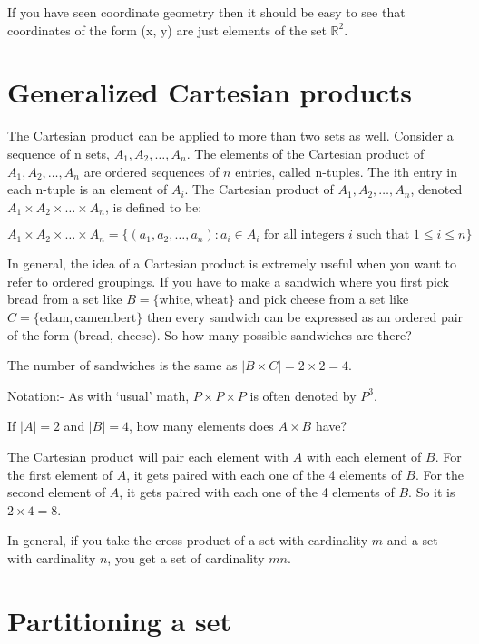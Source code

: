 \documentclass[12pt]{article}
\begin{document}
If you have seen coordinate geometry then it should be easy to see that coordinates of the form (x, y) are just elements of the set $\mathbb{R}^2$. 

\section*{Generalized Cartesian products}

The Cartesian product can be applied to more than two sets as well. Consider a sequence of n sets, $A_1, A_2, \ldots, A_n$. The elements of the Cartesian product of $A_1, A_2, \ldots, A_n$ are ordered sequences of $n$ entries, called n-tuples. The ith entry in each n-tuple is an element of $A_i$. The Cartesian product of $A_1, A_2, \ldots, A_n$, denoted $A_1 \times A_2 \times \ldots \times A_n$, is defined to be:

$A_1 \times A_2 \times \ldots \times A_n = \{ (a_1, a_2, \ldots , a_n) : a_i \in A_i \text{ for all integers } i \text{ such that } 1 \le i \le n\}$

In general, the idea of a Cartesian product is extremely useful when you want to refer to ordered groupings. If you have to make a sandwich where you first pick bread from a set like $B = \{\text{white},\text{wheat}\}$ and pick cheese from a set like 
$C = \{\text{edam}, \text{camembert}\}$ then every sandwich can be expressed as an ordered pair of the form (bread, cheese). So how many possible sandwiches are there? 

The number of sandwiches is the same as $|B \times C| = 2 \times 2 = 4$.

\vspace{1cm}

Notation:- As with `usual' math, $P \times P \times P$ is often denoted by $P^3$.
\vspace{1cm}

If $|A| = 2$ and $|B| = 4$, how many elements does $A \times B$ have?

The Cartesian product will pair each element with $A$ with each element of $B$. For the first element of $A$, it gets paired with each one of the 4 elements of $B$. For the second element of $A$, it gets paired with each one of the 4 elements of $B$. So it is $ 2 \times 4 = 8$.

In general, if you take the cross product of a set with cardinality $m$ and a set with cardinality $n$, you get a set of cardinality $mn$.

\section*{Partitioning a set}
\end{document}
